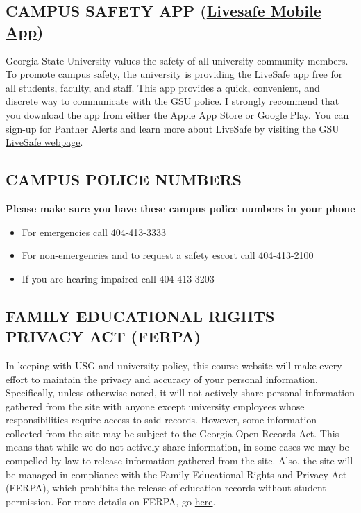 \documentclass{article}
\begin{document}
\subsection{CAMPUS SAFETY APP (\href{https://safety.gsu.edu/livesafe/}{Livesafe Mobile App})}
Georgia State University values the safety of all university community members.  To promote campus safety, the university is providing the LiveSafe app free for all students, faculty, and staff.  This app provides a quick, convenient, and discrete way to communicate with the GSU police.  I strongly recommend that you download the app from either the Apple App Store or Google Play.  You can sign-up for Panther Alerts and learn more about LiveSafe by visiting the GSU \href{https://safety.gsu.edu/livesafe/}{LiveSafe webpage}.

\subsection{CAMPUS POLICE NUMBERS}
\textbf{Please make sure you have these campus police numbers in your phone}
\begin{itemize}
  \item For emergencies call 404-413-3333
  \item For non-emergencies and to request a safety escort call 404-413-2100 
  \item If you are hearing impaired call 404-413-3203
\end{itemize}

\subsection{FAMILY EDUCATIONAL RIGHTS PRIVACY ACT (FERPA)}
In keeping with USG and university policy, this course website will make every effort to maintain the privacy and accuracy of your personal information. Specifically, unless otherwise noted, it will not actively share personal information gathered from the site with anyone except university employees whose responsibilities require access to said records. However, some information collected from the site may be subject to the Georgia Open Records Act. This means that while we do not actively share information, in some cases we may be compelled by law to release information gathered from the site. Also, the site will be managed in compliance with the Family Educational Rights and Privacy Act (FERPA), which prohibits the release of education records without student permission.  For more details on FERPA, go \href{https://registrar.gsu.edu/academic-records/records-access/#ferpa}{here}.
\end{document}
